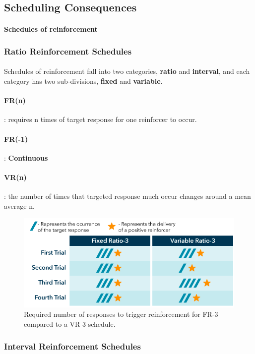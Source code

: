 \documentclass{article}
\begin{document}
	\subsection{Scheduling Consequences}
	\paragraph{Schedules of reinforcement}
	\subsubsection{Ratio Reinforcement Schedules}
	\paragraph{} Schedules of reinforcement fall into two categories, \textbf{ratio} and \textbf{interval}, and each category has two sub-divisions, \textbf{fixed} and \textbf{variable}.
	\paragraph{FR(n)}: requires n times of target response for one reinforcer to occur.
	\paragraph{FR(-1)}: \textbf{Continuous}
	\paragraph{VR(n)}: the number of times that targeted response much occur changes around a mean average n.
	\begin{figure}
		\centering
		\includegraphics[width=\linewidth]{pic/reinforce_ratio}
		\caption{Required number of responses to trigger reinforcement for FR-3 compared to a VR-3 schedule.}
	\end{figure}
	\subsubsection{Interval Reinforcement Schedules}
\end{document}
